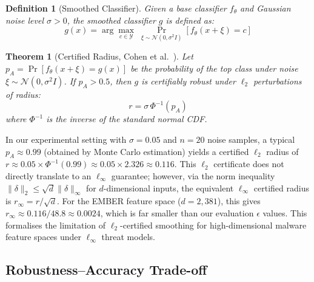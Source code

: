 \documentclass[conference]{IEEEtran}
\newtheorem{definition}{Definition}
\newtheorem{theorem}{Theorem}
\begin{document}
\begin{definition}[Smoothed Classifier]
Given a base classifier $f_\theta$ and Gaussian noise level $\sigma > 0$, the smoothed classifier $g$ is defined as:
\begin{equation}
g(x) = \arg\max_{c \in \mathcal{Y}}\; \Pr_{\xi \sim \mathcal{N}(0, \sigma^2 I)}\!\left[f_\theta(x + \xi) = c\right]
\end{equation}
\end{definition}

\begin{theorem}[Certified Radius, Cohen et al.~\cite{cohen2019}]
Let $p_A = \Pr[f_\theta(x + \xi) = g(x)]$ be the probability of the top class under noise $\xi \sim \mathcal{N}(0, \sigma^2 I)$. If $p_A > 0.5$, then $g$ is certifiably robust under $\ell_2$ perturbations of radius:
\begin{equation}
r = \sigma\, \Phi^{-1}(p_A)
\label{eq:certified_radius}
\end{equation}
where $\Phi^{-1}$ is the inverse of the standard normal CDF.
\end{theorem}

In our experimental setting with $\sigma = 0.05$ and $n = 20$ noise samples, a typical $p_A \approx 0.99$ (obtained by Monte Carlo estimation) yields a certified $\ell_2$ radius of $r \approx 0.05 \times \Phi^{-1}(0.99) \approx 0.05 \times 2.326 \approx 0.116$. This $\ell_2$ certificate does not directly translate to an $\ell_\infty$ guarantee; however, via the norm inequality $\|\delta\|_2 \leq \sqrt{d}\|\delta\|_\infty$ for $d$-dimensional inputs, the equivalent $\ell_\infty$ certified radius is $r_\infty = r/\sqrt{d}$. For the EMBER feature space ($d = 2{,}381$), this gives $r_\infty \approx 0.116/48.8 \approx 0.0024$, which is far smaller than our evaluation $\epsilon$ values. This formalises the limitation of $\ell_2$-certified smoothing for high-dimensional malware feature spaces under $\ell_\infty$ threat models.

\subsection{Robustness--Accuracy Trade-off}
\end{document}
